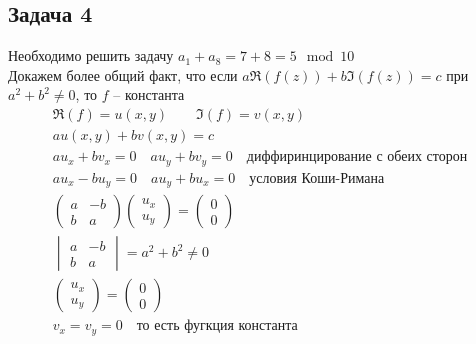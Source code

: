 \subsection*{Задача 4}
	Необходимо решить задачу $a_1 + a_8 = 7 + 8 = 5 \mod 10$\\
	Докажем более общий факт, что если $a \Re(f(z)) + b \Im(f(z)) = c$ при $a^2 + b^2 \ne 0$, то $f$ -- константа
	\begin{gather*}
		\Re(f) = u(x,y)\qquad \Im(f) = v(x,y)\\
		au(x,y) + bv(x,y) = c\\
		au_x + bv_x = 0\quad au_y + bv_y = 0\quad \text{диффиринцирование с обеих сторон}\\
		au_x - bu_y = 0\quad au_y + bu_x = 0\quad \text{условия Коши-Римана}\\
		\begin{pmatrix}
			a & -b \\ b & a
		\end{pmatrix}
		\begin{pmatrix}
			u_x \\ u_y
		\end{pmatrix}
		=
		\begin{pmatrix}
			0 \\ 0
		\end{pmatrix}\\
		\begin{vmatrix}
			a & -b \\ b & a
		\end{vmatrix}
		= a^2 + b^2 \ne 0\\
		\begin{pmatrix}
			u_x \\ u_y
		\end{pmatrix}
		=
		\begin{pmatrix}
			0 \\ 0
		\end{pmatrix}\\
		v_x = v_y = 0\quad \text{то есть фугкция константа}
	\end{gather*}
\vskip 0.4in

